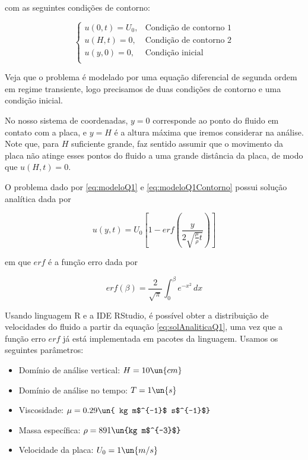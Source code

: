\noindent com as seguintes condições de contorno:

\begin{equation}\label{eq:modeloQ1Contorno}
    \begin{cases}
        u(0, t) = U_0, & \textrm{Condição de contorno 1} \\
        u(H, t) = 0,   & \textrm{Condição de contorno 2} \\
        u(y, 0) =  0,  & \textrm{Condição inicial}       \\
    \end{cases}
\end{equation}

Veja que o problema é modelado por uma equação diferencial de segunda ordem
em regime transiente, logo precisamos de duas condições de contorno e uma condição
inicial.

No nosso sistema de coordenadas, $y = 0$ corresponde ao ponto do fluido
em contato com a placa, e $y = H$ é a altura máxima que iremos considerar na análise.
Note que, para $H$ suficiente grande, faz sentido assumir que o movimento da placa
não atinge esses pontos do fluido a uma grande distância da placa, de modo que
$u(H, t) = 0$.

O problema dado por \eqref{eq:modeloQ1} e \eqref{eq:modeloQ1Contorno} possui solução analítica dada por

\begin{equation}\label{eq:solAnaliticaQ1}
    u(y,t) = U_0 \left[1 - erf\left(\frac{y}{2\sqrt{\frac{\mu}{\rho}t}}\right)\right]
\end{equation}

\noindent em que $erf$ é a função erro dada por

\begin{equation}\label{eq:erf}
    erf(\beta) = \frac{2}{\sqrt{\pi}} \int_0^\beta e^{-x^2} \, dx
\end{equation}

Usando linguagem R e a IDE RStudio,
é possível obter a distribuição de velocidades do fluido
a partir da equação \eqref{eq:solAnaliticaQ1}, uma vez que a função erro $erf$
já está implementada em pacotes da linguagem. Usamos os seguintes parâmetros:

\begin{itemize}
    \item Domínio de análise vertical: $H=10 \un{cm}$
    \item Domínio de análise no tempo: $T=1 \un{s}$
    \item Viscosidade: $\mu=0.29 \un{ kg m$^{-1}$ s$^{-1}$}$
    \item Massa específica: $\rho=891 \un{kg m$^{-3}$}$
    \item Velocidade da placa: $U_0 = 1 \un{m/s}$
\end{itemize}

